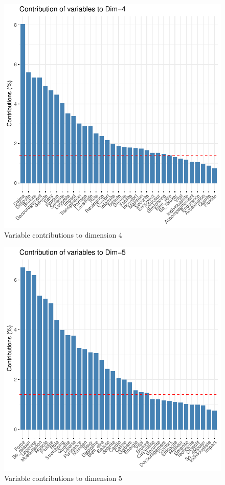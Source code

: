 \documentclass[12pt]{article}
\begin{document}
\begin{figure}[H]
\begin{center}
\includegraphics[scale=1.1]{ACP_4.pdf} 
\caption[]{Variable contributions to  dimension 4 }
\end{center}
\end{figure}

\begin{figure}[H]
\begin{center}
\includegraphics[scale=1.1]{ACP_5.pdf} 
\caption[]{ Variable contributions to  dimension 5 }
\end{center}
\end{figure}
\end{document}
